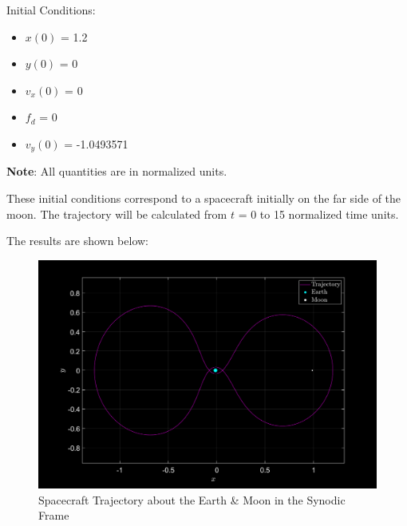 \documentclass{article}
\begin{document}
  Initial Conditions:
\begin{multicols}{4}
     \begin{itemize}
          \item $x(0)$ = 1.2
          \item $y(0)$ = 0
          \item $v_x(0)$ = 0
          \item $f_d$ = 0
          \item $v_y(0)$ = -1.0493571
    \end{itemize}
\end{multicols}

\textbf{Note}: All quantities are in normalized units.

\vspace{\baselineskip}

These initial conditions correspond to a spacecraft initially on the far side of the moon. The trajectory will be calculated from $t$ = 0 to 15 normalized time units.

\vspace{\baselineskip}

The results are shown below:

\begin{figure}[h]
    \centering
    \includegraphics[width=\textwidth]{fig/trajectory1.png}
    \caption{Spacecraft Trajectory about the Earth \& Moon in the Synodic Frame}
    \label{fig1}
\end{figure}

\pagebreak
\end{document}

